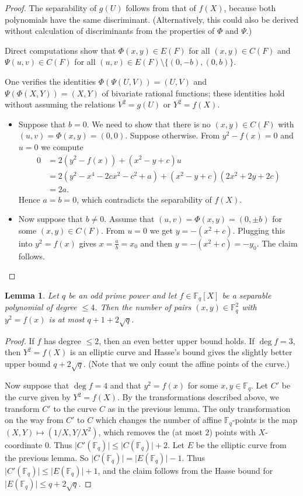 \documentclass[12pt]{amsart}
\theoremstyle{plain}
\newtheorem{lemma}[theorem]{Lemma}
\theoremstyle{definition}
\numberwithin{equation}{section}
\newcommand{\abs}[1]{\lvert#1\rvert}
\newcommand*{\set}[1]{\{#1\}}
\newcommand{\FF}{\mathbb F}
\begin{document}
\begin{proof}
  The separability of $g(U)$ follows from that of $f(X)$, because both
  polynomials have the same discriminant. (Alternatively, this could
  also be derived without calculation of discriminants from the
  properties of $\Phi$ and $\Psi$.)
  
  Direct computations show that $\Phi(x,y)\in E(F)$ for all
  $(x,y)\in C(F)$ and $\Psi(u, v)\in C(F)$ for all
  $(u, v)\in E(F)\setminus\set{(0, -b), (0, b)}$.

  One verifies the identities $\Phi(\Psi(U, V))=(U, V)$ and
  $\Psi(\Phi(X, Y))=(X, Y)$ of bivariate rational functions; these
  identities hold without assuming the relations $V^2=g(U)$ or
  $Y^2=f(X)$.

  \begin{itemize}
    \item[(a)] Suppose that $b=0$. We need to show that there is no
      $(x, y)\in C(F)$ with $(u, v)=\Phi(x, y)=(0, 0)$. Suppose
      otherwise. From $y^2 - f(x) = 0$ and $u = 0$ we compute
  \begin{align*}
    0 &=%
        2(y^2-f(x)) + (x^2 - y + c)u\\
      &= 2(y^2 - x^4 - 2cx^2 - c^2 + a)%
        + (x^2 - y + c)(2x^2 + 2y + 2c)\\
    &= 2a. 
  \end{align*}
  Hence $a=b=0$, which contradicts the separability of $f(X)$.
\item[(b)] Now suppose that $b\ne0$. Assume that
  $(u, v)=\Phi(x,y )=(0, \pm b)$ for some $(x, y)\in C(F)$. From $u=0$
  we get $y=-(x^2+c)$. Plugging this into $y^2=f(x)$ gives
  $x=\frac{a}{b}=x_0$ and then $y=-(x^2+c)=-y_0$. The claim follows.
\end{itemize}
\end{proof}
\begin{lemma}\label{l:hasse}
  Let $q$ be an odd prime power and let $f\in\FF_q[X]$ be a separable
  polynomial of degree $\le4$. Then the number of pairs
  $(x,y)\in\FF_q^2$ with $y^2=f(x)$ is at most $q+1+2\sqrt{q}$.
\end{lemma}
\begin{proof}
  If $f$ has degree $\le2$, then an even better upper bound holds. If
  $\deg f=3$, then $Y^2=f(X)$ is an elliptic curve and Hasse's bound
  gives the slightly better upper bound $q+2\sqrt{q}$. (Note that we
  only count the affine points of the curve.)

  Now suppose that $\deg f=4$ and that $y^2=f(x)$ for some
  $x,y\in\FF_q$. Let $C'$ be the curve given by $Y^2=f(X)$. By the
  transformations described above, we transform $C'$ to the curve $C$
  as in the previous lemma. The only transformation on the way from
  $C'$ to $C$ which changes the number of affine $\FF_q$-points is the
  map $(X,Y)\mapsto(1/X,Y/X^2)$, which removes the (at most $2$)
  points with $X$-coordinate $0$. Thus
  $\abs{C'(\FF_q)}\le\abs{C(\FF_q)}+2$. Let $E$ be the elliptic curve
  from the previous lemma. So $\abs{C(\FF_q)}=\abs{E(\FF_q)}-1$. Thus
  $\abs{C'(\FF_q)}\le\abs{E(\FF_q)}+1$, and the claim follows from the
  Hasse bound for $\abs{E(\FF_q)}\le q+2\sqrt{q}$.
\end{proof}
\end{document}
